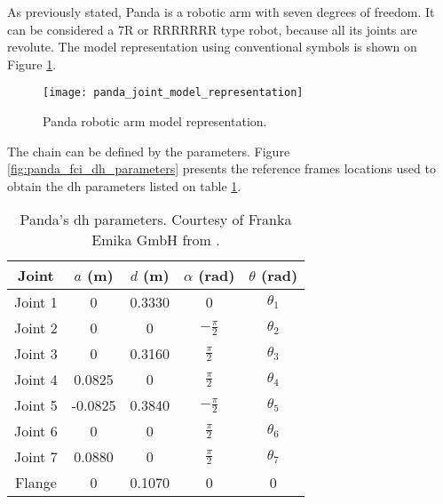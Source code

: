 As previously stated, Panda is a robotic arm with seven degrees of freedom. It can be considered a 7R or RRRRRRR type robot, because all its joints are revolute. The model representation using conventional symbols is shown on Figure \ref{fig:panda_joint_model_representation}.\\

\begin{figure}[htbp]
    \centering
	\texttt{[image: panda\_joint\_model\_representation]}
	\caption[Panda robotic arm model representation.]{Panda robotic arm model representation.}
	\label{fig:panda_joint_model_representation}
\end{figure}

The  chain can be defined by the  parameters. Figure \ref{fig:panda_fci_dh_parameters} presents the reference frames locations used to obtain the \gls{dh} parameters listed on table \ref{tab:panda_dh_parameters}.

\begin{table}[htbp]
    \caption[Panda's \gls{dh} parameters.]{Panda's \gls{dh} parameters. Courtesy of Franka Emika GmbH from \cite{FrankaEmikaGmbH_fci_documentation}.}
    \centering
    \begin{tabular}{c|c|c|c|c}
        \toprule
        \textbf{Joint} & \textbf{$a$ (m)} & \textbf{$d$ (m)} & \textbf{$\alpha$ (rad)} & \textbf{$\theta$ (rad)} \\
        \midrule
         Joint 1 & 0 & 0.3330 & 0 & $\theta_1$ \\
         \midrule
         Joint 2 & 0 & 0 & $-\frac{\pi}{2}$ & $\theta_2$ \\
         \midrule
         Joint 3 & 0 & 0.3160 & $\frac{\pi}{2}$ & $\theta_3$ \\
         \midrule
         Joint 4 & 0.0825 & 0 & $\frac{\pi}{2}$ & $\theta_4$ \\
         \midrule
         Joint 5 & -0.0825 & 0.3840 & $-\frac{\pi}{2}$ & $\theta_5$ \\
         \midrule
         Joint 6 & 0 & 0 & $\frac{\pi}{2}$ & $\theta_6$ \\
         \midrule
         Joint 7 & 0.0880 & 0 & $\frac{\pi}{2}$ & $\theta_7$ \\
         \midrule
         Flange & 0 & 0.1070 & 0 & 0 \\
         \bottomrule
    \end{tabular}
    \label{tab:panda_dh_parameters}
\end{table}


